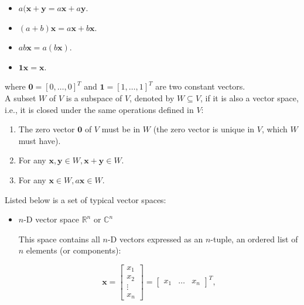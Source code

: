 \documentclass[10pt,b5paper,titlepage]{book}
\begin{document}
\begin{itemize}
\begin{enumerate}
                \begin{itemize}
                    \item $a (\mathbf{x} + \mathbf{y} = a \mathbf{x} + a \mathbf{y}$.
                    \item $(a + b) \mathbf{x} = a \mathbf{x} + b \mathbf{x}$.
                    \item $a b \mathbf{x} = a (b \mathbf{x})$.
                    \item $\mathbf{1} \mathbf{x} = \mathbf{x}$.
                \end{itemize}
        \end{enumerate}

        where $\mathbf{0} = [0, \ldots, 0]^{T}$ and $\mathbf{1} = [1, \ldots, 1]^{T}$
        are two constant vectors.\\

        A subset $W$ of $V$ is a subspace of $V$, denoted by $W \subseteq V$,
        if it is also a vector space, i.e., it is closed under the same
        operations defined in $V$:

        \begin{enumerate}
            \item The zero vector $\mathbf{0}$ of $V$ must be in $W$
                (the zero vector is unique in $V$, which $W$ must have).
            \item For any $\mathbf{x}, \mathbf{y} \in W, \mathbf{x} + \mathbf{y} \in W$.
            \item For any $\mathbf{x} \in W, a \mathbf{x} \in W$.
        \end{enumerate}

        Listed below is a set of typical vector spaces:

        \begin{itemize}
            \item $n$-D vector space $\mathbb{R}^{n}$ or $\mathbb{C}^{n}$

                This space contains all $n$-D vectors expressed as an  $n$-tuple,
                an ordered list of $n$ elements (or components):

                \begin{equation}
                    \mathbf{x} = \begin{bmatrix} x_1\\ x_2 \\ \vdots\\ x_n \end{bmatrix} =
                    \begin{bmatrix} x_1 & \ldots & x_n \end{bmatrix}^{T}
                ,\end{equation}


\end{itemize}
\end{itemize}
\end{document}
